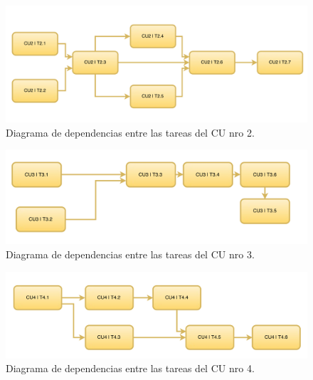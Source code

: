 \documentclass[a4paper, 10pt, twoside]{article}
\begin{document}
\begin{center}
  \begin{figure}[h!]
    \includegraphics[width=15cm]{diagramas/diag-dependecias2.png}
    \caption{Diagrama de dependencias entre las tareas del CU nro 2.}
    \label{fig:diag-dependecias2}
  \end{figure}
\end{center}

\begin{center}
  \begin{figure}[h!]
    \includegraphics[width=15cm]{diagramas/diag-dependecias3.png}
    \caption{Diagrama de dependencias entre las tareas del CU nro 3.}
    \label{fig:diag-dependecias3}
  \end{figure}
\end{center}

\begin{center}
  \begin{figure}[h!]
    \includegraphics[width=15cm]{diagramas/diag-dependecias4.png}
    \caption{Diagrama de dependencias entre las tareas del CU nro 4.}
    \label{fig:diag-dependecias4}
  \end{figure}
\end{center}
\end{document}

